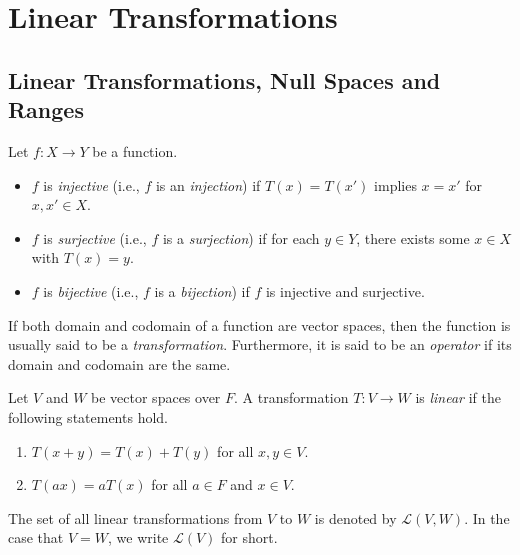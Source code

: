 \chapter{Linear Transformations}
\section{Linear Transformations, Null Spaces and Ranges}
\begin{definition}
  Let $f: X \to Y$ be a function.
  \begin{itemize}
    \item $f$ is \emph{injective} (i.e., $f$ is an \emph{injection})
      if $T(x) = T(x')$ implies $x = x'$ for $x, x' \in X$.
    \item $f$ is \emph{surjective} (i.e., $f$ is a \emph{surjection})
      if for each $y \in Y$, there exists some $x \in X$ with $T(x) = y$.
    \item $f$ is \emph{bijective} (i.e., $f$ is a \emph{bijection})
      if $f$ is injective and surjective.
  \end{itemize}
\end{definition}
\begin{remark}
  If both domain and codomain of a function are vector spaces, then the
  function is usually said to be a \emph{transformation}.
  Furthermore, it is said to be an \emph{operator} if its domain and codomain
  are the same.
\end{remark}

\begin{definition}
  Let $V$ and $W$ be vector spaces over $F$.
  A transformation $T: V \to W$ is \emph{linear} if the following statements
  hold.
  \begin{enumerate}
    \item $T(x + y) = T(x) + T(y)$ for all $x, y \in V$.
    \item $T(ax) = aT(x)$ for all $a \in F$ and $x \in V$.
  \end{enumerate}
  The set of all linear transformations from $V$ to $W$ is denoted by
  $\mathcal{L}(V, W)$.
  In the case that $V = W$, we write $\mathcal{L}(V)$ for short.
\end{definition}

